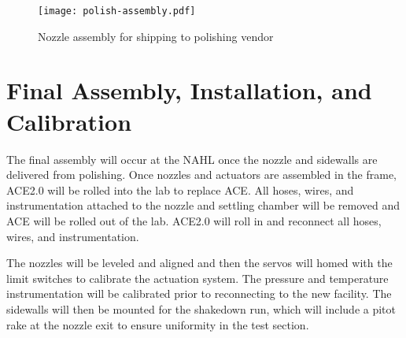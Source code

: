 \begin{figure}[ht!]
    \centering
    \texttt{[image: polish-assembly.pdf]}
    \caption{Nozzle assembly for shipping to polishing vendor}
    \label{fig:polish-assembly}
\end{figure}

\section{Final Assembly, Installation, and Calibration}

The final assembly will occur at the NAHL once the nozzle and sidewalls are delivered from polishing. Once nozzles and actuators are assembled in the frame, ACE2.0 will be rolled into the lab to replace ACE. All hoses, wires, and instrumentation attached to the nozzle and settling chamber will be removed and ACE will be rolled out of the lab. ACE2.0 will roll in and reconnect all hoses, wires, and instrumentation.

The nozzles will be leveled and aligned and then the servos will homed with the limit switches to calibrate the actuation system. The pressure and temperature instrumentation will be calibrated prior to reconnecting to the new facility. The sidewalls will then be mounted for the shakedown run, which will include a pitot rake at the nozzle exit to ensure uniformity in the test section.






